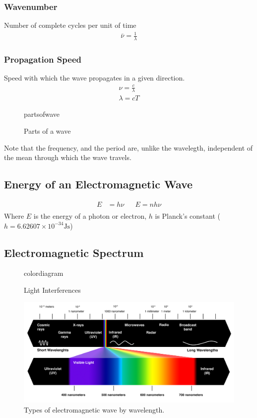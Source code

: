 \documentclass{article}[10pt]
\begin{document}
\subsubsection*{Wavenumber}
Number of complete cycles per unit of time
\begin{align*}
	\bar{\nu} = \frac{1}{\lambda}
\end{align*}

\subsubsection*{Propagation Speed}
Speed with which the wave propagates in a given direction.
\begin{align*}
	\nu = \frac{c}{\lambda} \\
	\lambda = cT
\end{align*}
\begin{figure}[H]
	\centering
	{partsofwave}
	\caption{Parts of a wave}\label{fig:partsofwave}
\end{figure}
Note that the frequency, and the period are, unlike the wavelegth, independent
of the mean through which the wave travels.

\subsection{Energy of an Electromagnetic Wave}
\begin{align*}
	E & = h\nu &   & E=nh\nu \\
\end{align*}
Where $E$ is the energy of a photon or electron, $h$ is Planck's constant
($h = 6.62607\times 10^{-34}\si{\joule\second}$)

\subsection{Electromagnetic Spectrum}
\begin{figure}[H]
	\centering
	{colordiagram}
	\caption{Light Interferences}\label{fig:colordiagram}
\end{figure}
\begin{figure}[H]
	\centering
	\includegraphics[scale=0.6]{radiations}
	\caption{Types of electromagnetic wave by wavelength.}\label{fig:radiations}
\end{figure}
\end{document}
